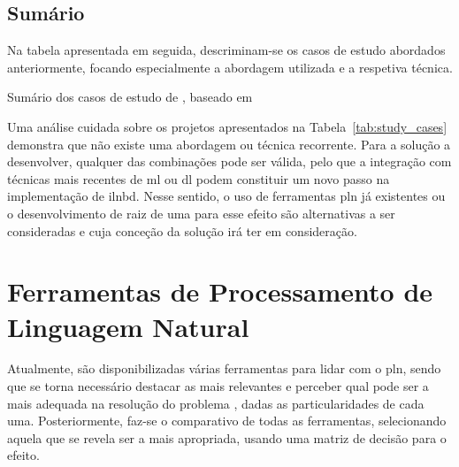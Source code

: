 \subsection{Sumário}
Na tabela apresentada em seguida, descriminam-se os casos de estudo abordados anteriormente, focando especialmente a abordagem utilizada e a respetiva técnica.

\begin{table}[!ht]
\caption{Sumário dos casos de estudo de , baseado em \textcite{survey_nlidb}}
\label{tab:study_cases}
\centering
\resizebox{\textwidth}{!}{}
\end{table}

Uma análise cuidada sobre os projetos apresentados na Tabela~\ref{tab:study_cases} demonstra que não existe uma abordagem ou técnica recorrente. Para a solução a desenvolver, qualquer das combinações pode ser válida, pelo que a integração com técnicas mais recentes de \gls{ml} ou \gls{dl} podem constituir um novo passo na implementação de \gls{ilnbd}. Nesse sentido, o uso de ferramentas \gls{pln} já existentes ou o desenvolvimento de raiz de uma para esse efeito são alternativas a ser consideradas e cuja conceção da solução irá ter em consideração.

\section{Ferramentas de Processamento de Linguagem Natural}
\label{sec:chap03_existingtools}
Atualmente, são disponibilizadas várias ferramentas para lidar com o \gls{pln}, sendo que se torna necessário destacar as mais relevantes e perceber qual pode ser a mais adequada na resolução do problema , dadas as particularidades de cada uma. Posteriormente, faz-se o comparativo de todas as ferramentas, selecionando aquela que se revela ser a mais apropriada, usando uma matriz de decisão para o efeito.

